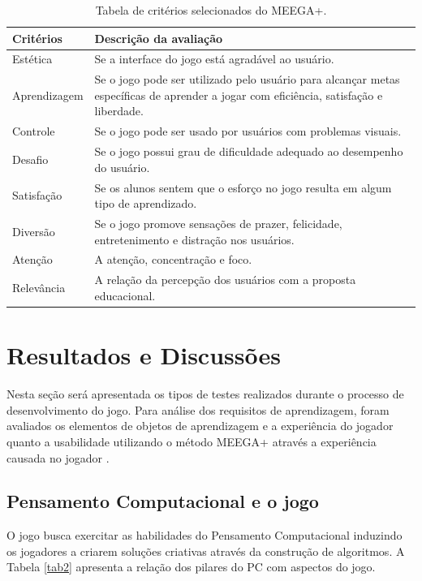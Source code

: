 \documentclass[10pt, conference, compsocconf]{IEEEtran}
\begin{document}
	
	
	\begin{table}[!ht]
	\caption{Tabela de critérios selecionados do MEEGA+.}
	\begin{center}
	\begin{tabular}{|l|p{5.8cm}|}
	\hline
	\textbf{Critérios}&\textbf{Descrição da avaliação} \\
	\hline
	Estética & Se a interface do jogo está agradável ao usuário. \\
	\hline
	Aprendizagem & Se o jogo pode ser utilizado pelo usuário para alcançar metas específicas de aprender a jogar com eficiência, satisfação e liberdade.
	\\
	\hline
	Controle & Se o jogo pode ser usado por usuários com problemas visuais.
	\\
	\hline
	Desafio & Se o jogo possui grau de dificuldade adequado ao desempenho do usuário.
	\\
	\hline
	Satisfação & Se os alunos sentem que o esforço no jogo resulta em algum tipo de aprendizado.
	\\
	\hline
	Diversão & Se o jogo promove sensações de prazer, felicidade, entretenimento e distração nos usuários.
	\\
	\hline
	Atenção & A atenção, concentração e foco.
	\\
	\hline
	Relevância & A relação da percepção dos usuários com a proposta educacional.
	\\
	\hline
	\end{tabular}
	\label{tab3}
	\end{center}
	\end{table}
	


\section{Resultados e Discussões} \label{resultado}

Nesta seção será apresentada os tipos de testes realizados durante o processo de desenvolvimento do jogo. Para análise dos requisitos de aprendizagem, foram avaliados os elementos de objetos de aprendizagem \cite{alves2015gamification} e a experiência do jogador quanto a usabilidade utilizando o método MEEGA+ através a experiência causada no jogador \cite{von2018meega+}.

\subsection{Pensamento Computacional e o jogo}
O jogo busca exercitar as habilidades do Pensamento Computacional induzindo os jogadores a criarem soluções criativas através da construção de algoritmos. A Tabela \ref{tab2} apresenta a relação dos pilares do PC com aspectos do jogo.
\end{document}
